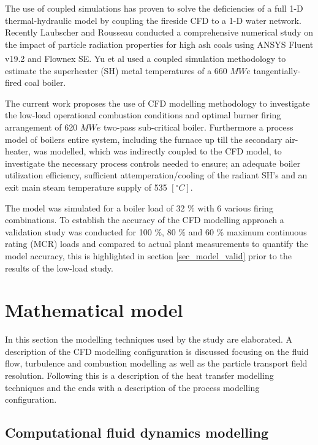 \documentclass[review]{elsarticle}
\begin{document}
The use of coupled simulations has proven to solve the deficiencies of a full 1-D thermal-hydraulic model by coupling the fireside CFD to a 1-D water network. Recently Laubscher and Rousseau \cite{Laubscher2020} conducted a comprehensive numerical study on the impact of particle radiation properties for high ash coals using ANSYS Fluent v19.2\textsuperscript{\textregistered} and Flownex SE\textsuperscript{\textregistered}. Yu et al \cite{Yu2019} used a coupled simulation methodology to estimate the superheater (SH) metal temperatures of a 660 $MWe$ tangentially-fired coal boiler.

The current work proposes the use of CFD modelling methodology to investigate the low-load operational combustion conditions and optimal burner firing arrangement of 620 $MWe$ two-pass sub-critical boiler. Furthermore a process model of boilers entire system, including the furnace up till the secondary air-heater, was modelled, which was indirectly coupled to the CFD model, to investigate the necessary process controls needed to ensure; an adequate boiler utilization efficiency, sufficient attemperation/cooling of the radiant SH's and an exit main steam temperature supply of 535 $[^\circ C]$. 

The model was simulated for a boiler load of 32 $\%$  with 6 various firing combinations. To establish the accuracy of the CFD modelling approach a validation study was conducted for 100 $\%$, 80 $\%$ and 60 $\%$ maximum continuous rating (MCR) loads and compared to actual plant measurements to quantify the model accuracy, this is highlighted in section \ref{sec_model_valid} prior to the results of the low-load study. 

\section{Mathematical model}
In this section the modelling techniques used by the study are elaborated. A description of the CFD modelling configuration is discussed focusing on the fluid flow, turbulence and combustion modelling as well as the particle transport field resolution. Following this is a description of the heat transfer modelling techniques and the ends with a description of the process modelling configuration.
\subsection{Computational fluid dynamics modelling}
\end{document}

